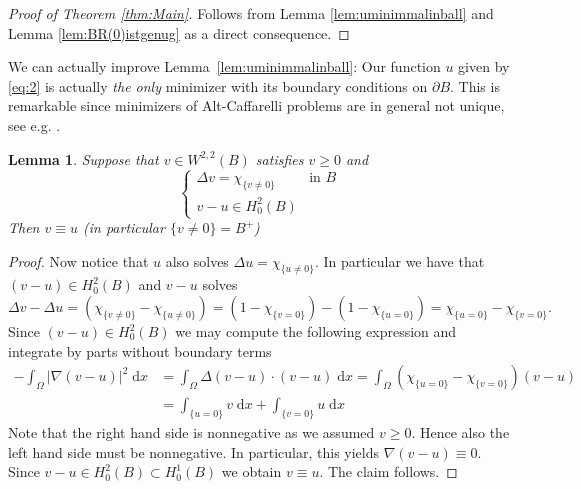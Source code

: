 \documentclass[twoside,11pt]{article}
\newtheorem{lemma}{Lemma}
\theoremstyle{definition}
\begin{document}
\begin{proof}[Proof of Theorem \ref{thm:Main}] Follows from Lemma \ref{lem:uminimmalinball}  and Lemma \ref{lem:BR(0)istgenug} as a direct consequence.  \end{proof}

We can actually improve Lemma~\ref{lem:uminimmalinball}: Our function $u$ given by \ref{eq:2} is actually \emph{the only} minimizer with its boundary conditions on $\partial B$. This is remarkable since minimizers of Alt-Caffarelli problems are in general not unique, see e.g. \cite[Remark 2]{GMMathAnn}. 

\begin{lemma}
    Suppose that $v \in W^{2,2}(B)$ satisfies $v \geq 0$ and 
    \begin{equation}
        \begin{cases}
            \Delta v = \chi_{\{ v \neq 0 \} }  & \textrm{in $B$} \\ v-u \in H_0^2(B)
        \end{cases}
    \end{equation}
    Then $v \equiv u$ (in particular $ \{ v \neq 0 \} = B^+$)
\end{lemma}
\begin{proof}%
    Now notice that $u$ also solves $\Delta u = \chi_{\{ u \neq 0 \}}$. In particular we have that $(v-u) \in H_0^2(B)$ and $v-u$ solves
    \begin{equation}
        \Delta v - \Delta u = (\chi_{\{v \neq 0 \}} - \chi_{\{ u \neq 0 \} } ) = (1 - \chi_{\{v = 0 \}}) - (1-\chi_{\{u =  0 \}}) = \chi_{\{ u  =0 \}} - \chi_{\{ v = 0 \}} .
    \end{equation}
    Since $(v-u) \in H_0^2(B)$ we may compute the following expression and integrate by parts without boundary terms
    \begin{align}
        -\int_\Omega | \nabla (v-u) |^2 \; \mathrm{d}x  & =  \int_\Omega \Delta (v-u) \cdot (v-u) \; \mathrm{d}x = \int_\Omega  (\chi_{\{ u = 0 \} } - \chi_{\{ v = 0 \} }) (v-u)  \\ & =  \int_{\{ u = 0 \} } v \; \mathrm{d}x + \int_{\{v = 0 \}}  u \; \mathrm{d}x 
    \end{align}
    Note that the right hand side is nonnegative as we assumed $v \geq 0$. Hence also the left hand side must be nonnegative. In particular, this yields $\nabla (v-u) \equiv 0$. Since $v-u \in H_0^2(B) \subset H_0^1(B)$ we obtain $v \equiv u$. The claim follows. 
\end{proof}
\end{document}
